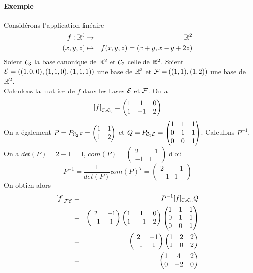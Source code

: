 \paragraph{Exemple} Considérons l'application linéaire
\begin{eqnarray*}
  f: \mathbb{R}^3 &\rightarrow& \mathbb{R}^2 \\
  (x, y, z) &\mapsto& f(x, y, z) = (x + y, x - y + 2z)
\end{eqnarray*}
Soient $\mathcal{C}_3$ la base canonique de $\mathbb{R}^3$ et $\mathcal{C}_2$ celle de $\mathbb{R}^2$. Soient $\mathcal{E} = ((1, 0, 0), (1, 1, 0), (1, 1, 1))$ une base de $\mathbb{R}^3$ et $\mathcal{F} = ((1, 1), (1, 2))$ une base de $\mathbb{R}^2$. \\
Calculons la matrice de $f$ dans les bases $\mathcal{E}$ et $\mathcal{F}$. On a
$$\left[f\right]_{\mathcal{C}_2 \mathcal{C}_3} = 
\begin{pmatrix}
  1 & 1  & 0 \\
  1 & -1 & 2
\end{pmatrix}$$
On a également $P = P_{\mathcal{C}_2 \mathcal{F}} = \begin{pmatrix} 1 & 1 \\ 1 & 2 \end{pmatrix}$ et $Q = P_{\mathcal{C}_3 \mathcal{E}} = \begin{pmatrix} 1 & 1 & 1 \\ 0 & 1 & 1 \\ 0 & 0 & 1 \end{pmatrix}$. Calculons $P^{-1}$. On a $det(P) = 2 - 1 = 1$, $com(P) = \begin{pmatrix} 2 & -1 \\ -1 & 1 \end{pmatrix}$ d'où
$$P^{-1} = \frac{1}{det(P)} com(P)^{T} = \begin{pmatrix} 2 & -1 \\ -1 & 1 \end{pmatrix}$$
On obtien alors
\begin{eqnarray*}
  \left[f\right]_{\mathcal{F} \mathcal{E}} &=& P^{-1}  [f]_{\mathcal{C}_2 \mathcal{C}_3} Q \\
    &=& \begin{pmatrix} 2 & -1 \\ -1 & 1 \end{pmatrix} \begin{pmatrix} 1 & 1 & 0 \\ 1 & -1 & 2 \end{pmatrix} \begin{pmatrix} 1 & 1 & 1 \\ 0 & 1 & 1 \\ 0 & 0 & 1 \end{pmatrix} \\
    &=& \begin{pmatrix} 2 & -1 \\ -1 & 1 \end{pmatrix} \begin{pmatrix} 1 & 2 & 2 \\ 1 & 0 & 2 \end{pmatrix} \\
    &=& \begin{pmatrix} 1 & 4 & 2 \\ 0 & -2 & 0 \end{pmatrix}
\end{eqnarray*}

